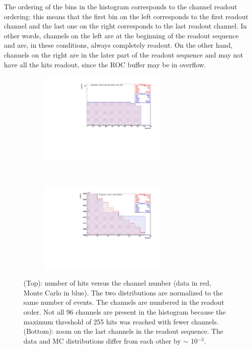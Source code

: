 The ordering of the bins in the histogram corresponds 
to the channel readout ordering: this means that 
the first bin on the left corresponds to the first 
readout channel and the last one on the right 
corresponds to the last readout channel.
In other words, channels on the left 
are at the beginning of the readout sequence 
and are, in these conditions, always 
completely readout. On the other hand, channels on 
the right are in the 
later part of the readout sequence and may 
not have all the hits readout, 
since the ROC buffer may be in overflow.
  \begin{figure}[!h]
    \begin{subfigure}[b]{\textwidth}
        \centering
        \includegraphics[width=0.7\textwidth]{figures/pdf/figure_00004_nhitsvschannel_roc_simulation_281.pdf}
        \label{fig:tt1}
    \end{subfigure}
  \\
    \begin{subfigure}[b]{\textwidth}
        \centering
        \includegraphics[width=0.7\textwidth]{figures/pdf/figure_00014_nhitsvschannel_roc_simulation_281.pdf}
        \label{fig:tt2}
    \end{subfigure}
       \caption[The occupancy histogram (RUN281).]{(Top): number of hits versus the channel number 
       (data in red, Monte Carlo in blue). The two distributions 
       are normalized to the same number of events.
       The channels are numbered in the readout order. Not all 96 channels 
       are present in the histogram 
       because the maximum threshold of 255 hits was reached with fewer channels.
       (Bottom): zoom on the last channels in the readout sequence. The data 
       and MC distributions differ from each other by $\sim$ 10$^{-3}$.}
       \label{fig:2}
  \end{figure}


